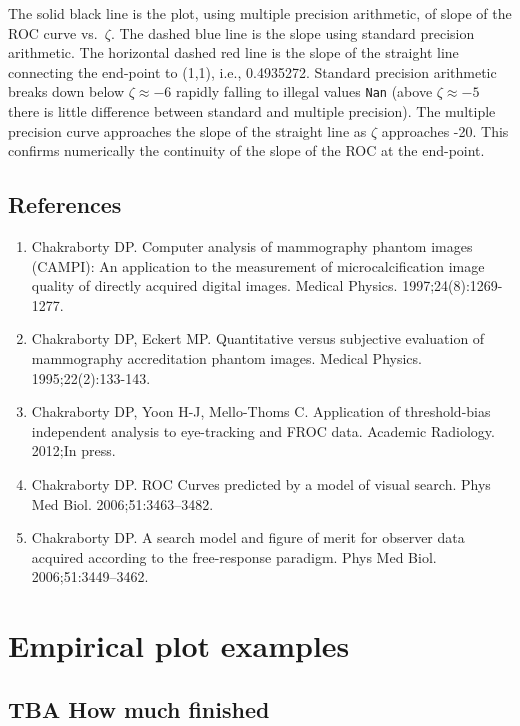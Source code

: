 \documentclass[
]{book}
\providecommand{\tightlist}{%
  \setlength{\itemsep}{0pt}\setlength{\parskip}{0pt}}
\begin{document}
The solid black line is the plot, using multiple precision arithmetic, of slope of the ROC curve vs.~\(\zeta\). The dashed blue line is the slope using standard precision arithmetic. The horizontal dashed red line is the slope of the straight line connecting the end-point to (1,1), i.e., 0.4935272. Standard precision arithmetic breaks down below \(\zeta \approx -6\) rapidly falling to illegal values \texttt{Nan} (above \(\zeta \approx -5\) there is little difference between standard and multiple precision). The multiple precision curve approaches the slope of the straight line as \(\zeta\) approaches -20. This confirms numerically the continuity of the slope of the ROC at the end-point.

\hypertarget{rsm-pred-references}{%
\section{References}\label{rsm-pred-references}}

\begin{enumerate}
\def\labelenumi{\arabic{enumi}.}
\tightlist
\item
  Chakraborty DP. Computer analysis of mammography phantom images (CAMPI): An application to the measurement of microcalcification image quality of directly acquired digital images. Medical Physics. 1997;24(8):1269-1277.
\item
  Chakraborty DP, Eckert MP. Quantitative versus subjective evaluation of mammography accreditation phantom images. Medical Physics. 1995;22(2):133-143.
\item
  Chakraborty DP, Yoon H-J, Mello-Thoms C. Application of threshold-bias independent analysis to eye-tracking and FROC data. Academic Radiology. 2012;In press.
\item
  Chakraborty DP. ROC Curves predicted by a model of visual search. Phys Med Biol. 2006;51:3463--3482.
\item
  Chakraborty DP. A search model and figure of merit for observer data acquired according to the free-response paradigm. Phys Med Biol. 2006;51:3449--3462.
\end{enumerate}

\hypertarget{froc-empirical-examples}{%
\chapter{Empirical plot examples}\label{froc-empirical-examples}}

\hypertarget{froc-empirical-examples-how-much-finished}{%
\section{TBA How much finished}\label{froc-empirical-examples-how-much-finished}}
\end{document}
